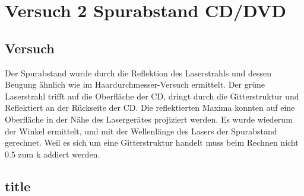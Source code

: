 \documentclass{article}
\begin{document}
\section{Versuch 2 Spurabstand CD/DVD}
\subsection{Versuch}
Der Spurabstand wurde durch die Reflektion des Laserstrahls und dessen Beugung ähnlich wie im
Haardurchmesser-Versuch ermittelt. Der grüne Laserstrahl trifft auf die Oberfläche der CD, dringt
durch die Gitterstruktur und Reflektiert an der Rückseite der CD. Die reflektierten Maxima konnten auf
eine Oberfläche in der Nähe des Lasergerätes projiziert werden. Es wurde wiederum der Winkel ermittelt,
und mit der Wellenlänge des Lasers der Spurabstand gerechnet. Weil es sich um eine Gitterstruktur
handelt muss beim Rechnen nicht 0.5 zum k addiert werden.
\subsection{title}
\end{document}
